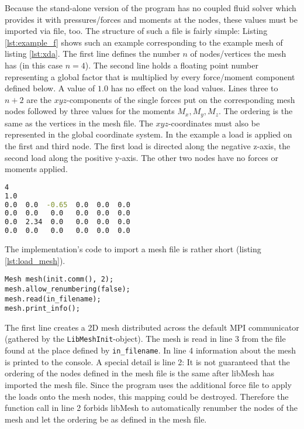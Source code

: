    Because the stand-alone version of the program has no coupled fluid solver which provides it with pressures/forces and moments at the nodes, these values must be imported via file, too. The structure of such a file is fairly simple: Listing \ref{lst:example_f} shows such an example corresponding to the example mesh of listing \ref{lst:xda}. The first line defines the number $n$ of nodes/vertices the mesh has (in this case $n=4$). The second line holds a floating point number representing a global factor that is multiplied by every force/moment component defined below. A value of $1.0$ has no effect on the load values. Lines three to $n+2$ are the $xyz$-components of the single forces put on the corresponding mesh nodes followed by three values for the moments $M_x, M_y, M_z$. The ordering is the same as the vertices in the mesh file. The $xyz$-coordinates must also be represented in the global coordinate system. In the example a load is applied on the first and third node. The first load is directed along the negative z-axis, the second load along the positive y-axis. The other two nodes have no forces or moments applied.
\begin{lstlisting}[caption=Example force file,label=lst:example_f,language=bash,keepspaces=true]
4
1.0
0.0  0.0  -0.65  0.0  0.0  0.0
0.0  0.0   0.0   0.0  0.0  0.0
0.0  2.34  0.0   0.0  0.0  0.0
0.0  0.0   0.0   0.0  0.0  0.0
\end{lstlisting}
   
   The implementation's code to import a mesh file is rather short (listing \ref{lst:load_mesh}).
\begin{lstlisting}[caption=Loading mesh and prepare for use,label=lst:load_mesh,keepspaces=true]
Mesh mesh(init.comm(), 2);
mesh.allow_renumbering(false);
mesh.read(in_filename);	
mesh.print_info();
\end{lstlisting}   
   The first line creates a 2D mesh distributed across the default MPI communicator (gathered by the \texttt{LibMeshInit}-object). The mesh is read in line 3 from the file found at the place defined by \texttt{in\_filename}. In line 4 information about the mesh is printed to the console. A special detail is line 2: It is not guaranteed that the ordering of the nodes defined in the mesh file is the same after libMesh has imported the mesh file. Since the program uses the additional force file to apply the loads onto the mesh nodes, this mapping could be destroyed. Therefore the function call in line 2 forbids libMesh to automatically renumber the nodes of the mesh and let the ordering be as defined in the mesh file.


